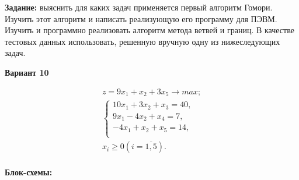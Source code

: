 \documentclass[a4paper,14pt]{extarticle}
\begin{document}
\textbf{Задание: }выяснить для каких задач применяется первый алгоритм Гомори.
Изучить этот алгоритм и написать реализующую его программу для
ПЭВМ. Изучить и программно реализовать алгоритм метода ветвей
и границ. В качестве тестовых данных использовать, решенную
вручную одну из нижеследующих задач.

\begin{center}
    \textbf{Вариант 10}
\end{center}
\begin{equation*}
    \begin{aligned}
        z = 9x_1 + x_2 + 3x_5 \rightarrow max; \\
        \begin{cases}
            10x_1 + 3x_2 + x_3 = 40, \\
            9x_1 - 4x_2 + x_4 = 7,   \\
            -4x_1 + x_2 + x_5 = 14,  \\
        \end{cases}               \\
        x_i \geq 0 (i=\overline{1, 5}).
    \end{aligned}
\end{equation*}\\

\textbf{Блок-схемы: }
\begin{center}
    \bigbreak
    \bigbreak
\end{center}
\end{document}
